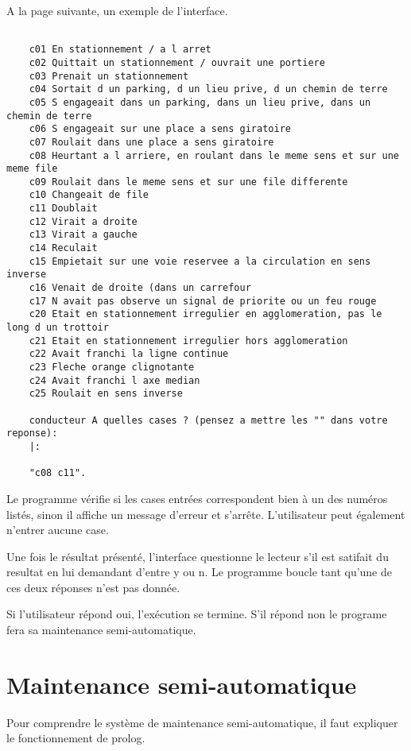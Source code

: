 A la page suivante, un exemple de l'interface.

\newpage

\begin{lstlisting}[frame=single]

    c01 En stationnement / a l arret
    c02 Quittait un stationnement / ouvrait une portiere
    c03 Prenait un stationnement
    c04 Sortait d un parking, d un lieu prive, d un chemin de terre
    c05 S engageait dans un parking, dans un lieu prive, dans un chemin de terre
    c06 S engageait sur une place a sens giratoire
    c07 Roulait dans une place a sens giratoire
    c08 Heurtant a l arriere, en roulant dans le meme sens et sur une meme file
    c09 Roulait dans le meme sens et sur une file differente
    c10 Changeait de file
    c11 Doublait
    c12 Virait a droite
    c13 Virait a gauche
    c14 Reculait
    c15 Empietait sur une voie reservee a la circulation en sens inverse
    c16 Venait de droite (dans un carrefour
    c17 N avait pas observe un signal de priorite ou un feu rouge
    c20 Etait en stationnement irregulier en agglomeration, pas le long d un trottoir
    c21 Etait en stationnement irregulier hors agglomeration
    c22 Avait franchi la ligne continue
    c23 Fleche orange clignotante
    c24 Avait franchi l axe median
    c25 Roulait en sens inverse

    conducteur A quelles cases ? (pensez a mettre les "" dans votre reponse):
    |: 

    "c08 c11".
\end{lstlisting}

Le programme vérifie si les cases entrées correspondent bien à un des numéros listés, sinon il affiche un message d'erreur et s'arrête.
L'utilisateur peut également n'entrer aucune case.

Une fois le résultat présenté, l'interface questionne le lecteur s'il est satifait du resultat en lui demandant d'entre y ou n. Le programme boucle tant qu'une de ces deux réponses n'est pas donnée.

Si l'utilisateur répond oui, l'exécution se termine. S'il répond non le programe fera sa maintenance semi-automatique.


\section{Maintenance semi-automatique}

Pour comprendre le système de maintenance semi-automatique, il faut expliquer le fonctionnement de prolog.

